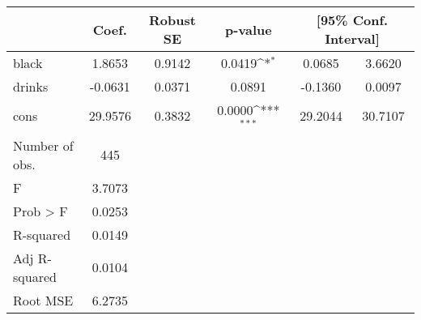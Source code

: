 {
\def\sym#1{\ifmmode^{#1}\else\(^{#1}\)\fi}
\begin{tabular}{l*{1}{ccccc}}
\toprule
            &       Coef.&   Robust SE&     p-value         &\multicolumn{2}{c}{[95\% Conf. Interval]}            \\
\midrule
black       &      1.8653&      0.9142&      0.0419\sym{*}  &      0.0685&      3.6620\\
drinks      &     -0.0631&      0.0371&      0.0891         &     -0.1360&      0.0097\\
cons        &     29.9576&      0.3832&      0.0000\sym{***}&     29.2044&     30.7107\\
\midrule
Number of obs.&         445&            &                     &            &            \\
F           &      3.7073&            &                     &            &            \\
Prob > F    &      0.0253&            &                     &            &            \\
R-squared   &      0.0149&            &                     &            &            \\
Adj R-squared&      0.0104&            &                     &            &            \\
Root MSE    &      6.2735&            &                     &            &            \\
\bottomrule
\end{tabular}
}

